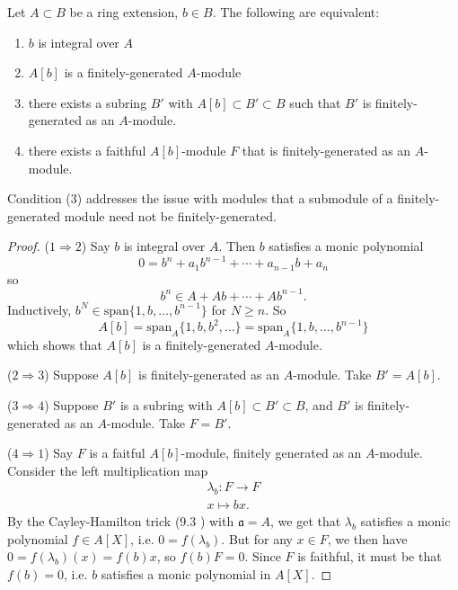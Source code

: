 \documentclass[12pt]{article}
\begin{document}
\begin{proposition}
	Let $A\subset B$ be a ring extension, $b\in B$. The following are equivalent:
	\begin{enumerate}
		\item $b$ is integral over $A$
		\item $A[b]$ is a finitely-generated $A$-module
		\item there exists a subring $B'$ with $A[b]\subset B' \subset B$ such that $B'$ is finitely-generated as an $A$-module.
		\item there exists a faithful $A[b]$-module $F$ that is finitely-generated as an $A$-module.
	\end{enumerate}
\end{proposition}

\begin{remark}
	Condition (3) addresses the issue with modules that a submodule of a finitely-generated module need not be finitely-generated.
\end{remark}

\begin{proof}
	($1\Rightarrow 2$) Say $b$ is integral over $A$. Then $b$ satisfies a monic polynomial 
	\begin{equation*}
		0 = b^n + a_1 b^{n-1} + \cdots + a_{n-1}b + a_n
	\end{equation*}
	so 
	\begin{equation*}
		b^n \in A + Ab + \cdots + Ab^{n-1}.
	\end{equation*}
	Inductively, $b^N\in\text{span}\{1,b,\dots,b^{n-1}\}$ for $N\geq n$. So
	\begin{equation*}
		A[b]=\text{span}_A\{1,b,b^2,\dots\}=\text{span}_A\{1,b,\dots,b^{n-1}\}
	\end{equation*} which shows that $A[b]$ is a finitely-generated $A$-module.

	($2\Rightarrow 3$) Suppose $A[b]$ is finitely-generated as an $A$-module. Take $B' = A[b]$.

	($3\Rightarrow 4$) Suppose $B'$ is a subring with $A[b]\subset B'\subset B$, and $B'$ is finitely-generated as an $A$-module. Take $F=B'$.

	($4\Rightarrow 1$) Say $F$ is a faitful $A[b]$-module, finitely generated as an $A$-module. Consider the left multiplication map 
	\begin{gather*}
		\lambda_b: F\to F \\
		x \mapsto bx.
	\end{gather*}
	By the Cayley-Hamilton trick (9.3 ) with $\mathfrak{a}=A$, we get that $\lambda_b$ satisfies a monic polynomial $f\in A[X]$, i.e. $0=f(\lambda_b)$. But for any $x\in F$, we then have $0=f(\lambda_b)(x)=f(b)x$, so $f(b)F=0$. Since $F$ is faithful, it must be that $f(b)=0$, i.e. $b$ satisfies a monic polynomial in $A[X]$.
\end{proof}
\end{document}
